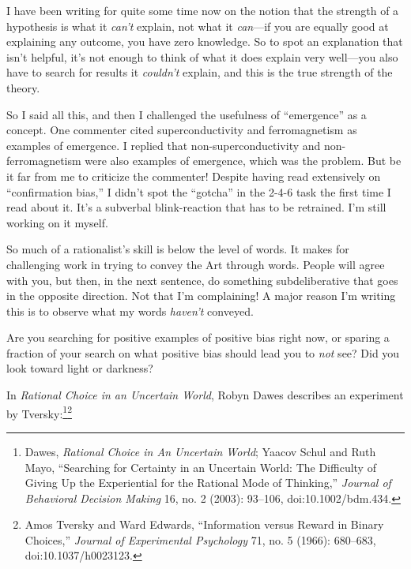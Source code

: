 {
 I have been writing for quite some time now on the notion that the
strength of a hypothesis is what it \textit{can't}
explain, not what it \textit{can}{}---if you are equally good at
explaining any outcome, you have zero knowledge. So to spot an
explanation that isn't helpful, it's
not enough to think of what it does explain very well---you also have
to search for results it \textit{couldn't} explain, and
this is the true strength of the theory.}

{
 So I said all this, and then I challenged the usefulness of
``emergence'' as a concept. One
commenter cited superconductivity and ferromagnetism as examples of
emergence. I replied that non-superconductivity and non-ferromagnetism
were also examples of emergence, which was the problem. But be it far
from me to criticize the commenter! Despite having read extensively on
``confirmation bias,'' I
didn't spot the
``gotcha'' in the 2-4-6 task the
first time I read about it. It's a subverbal
blink-reaction that has to be retrained. I'm still
working on it myself.}

{
 So much of a rationalist's skill is below the
level of words. It makes for challenging work in trying to convey the
Art through words. People will agree with you, but then, in the next
sentence, do something subdeliberative that goes in the opposite
direction. Not that I'm complaining! A major reason
I'm writing this is to observe what my words
\textit{haven't} conveyed.}

{
 Are you searching for positive examples of positive bias right
now, or sparing a fraction of your search on what positive bias should
lead you to \textit{not} see? Did you look toward light or darkness?}

\myendsectiontext


\bigskip


{
 In \textit{Rational Choice in an Uncertain World}, Robyn Dawes
describes an experiment by Tversky:\footnote{Dawes, \textit{Rational Choice in An Uncertain World}; Yaacov
Schul and Ruth Mayo, ``Searching for Certainty in an
Uncertain World: The Difficulty of Giving Up the Experiential for the
Rational Mode of Thinking,'' \textit{Journal of
Behavioral Decision Making} 16, no. 2 (2003): 93--106,
doi:10.1002/bdm.434.}\supercomma\footnote{Amos Tversky and Ward Edwards, ``Information
versus Reward in Binary Choices,'' \textit{Journal of
Experimental Psychology} 71, no. 5 (1966): 680--683,
doi:10.1037/h0023123.}}

